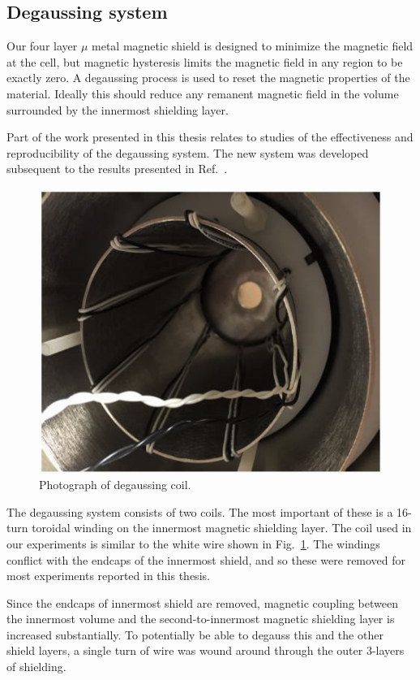 \subsection{Degaussing system\label{sec:Degaussing}}

Our four layer $\mu$ metal magnetic shield is designed to minimize the
magnetic field at the cell, but magnetic hysteresis limits the
magnetic field in any region to be exactly zero.  A degaussing process
is used to reset the magnetic properties of the material.  Ideally
this should reduce any remanent magnetic field in the volume
surrounded by the innermost shielding layer.  

Part of the work presented in this thesis relates to studies of the
effectiveness and reproducibility of the degaussing system.  The new
system was developed subsequent to the results presented in
Ref.~\cite{Martin:2014foa}.

\begin{figure}%
\centering
\includegraphics[width=0.6\linewidth]{figures/degaussing_coil.png}
\caption{Photograph of degaussing coil.\label{fig:degaussing_ccoil.}}
\end{figure}

The degaussing system consists of two coils.  The most important of
these is a 16-turn toroidal winding on the innermost magnetic
shielding layer.  The coil used in our experiments is similar to the
white wire shown in Fig.~\ref{fig:degaussing_ccoil.}.  The windings
conflict with the endcaps of the innermost shield, and so these were
removed for most experiments reported in this thesis.

Since the endcaps of innermost shield are removed, magnetic coupling
between the innermost volume and the second-to-innermost magnetic
shielding layer is increased substantially.  To potentially be able to
degauss this and the other shield layers, a single turn of wire was
wound around through the outer 3-layers of shielding.

